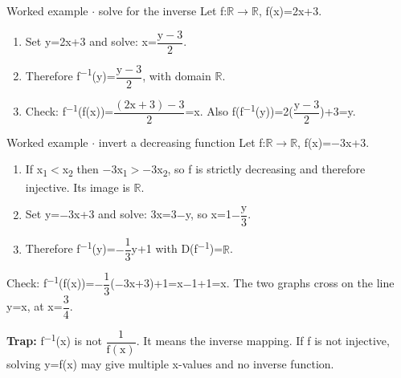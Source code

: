 \documentclass[11pt]{article}
\begin{document}
\begin{keepsection}
\begin{workedbox}{Worked example \ensuremath{\cdot} solve for the inverse}
Let f:\ensuremath{\mathbb{R}}\ensuremath{\to}\ensuremath{\mathbb{R}}, f(x)=2x+3.

\begin{enumerate}
\item Set y=2x+3 and solve: x={\small\ensuremath{\dfrac{\mathrm{y}-3}{2}}}.
\item Therefore f\textsuperscript{\ensuremath{-}1}(y)={\small\ensuremath{\dfrac{\mathrm{y}-3}{2}}}, with domain \ensuremath{\mathbb{R}}.
\item Check: f\textsuperscript{\ensuremath{-}1}(f(x))={\small\ensuremath{\dfrac{(2\mathrm{x}+3)-3}{2}}}=x. Also f(f\textsuperscript{\ensuremath{-}1}(y))=2({\small\ensuremath{\dfrac{\mathrm{y}-3}{2}}})+3=y.
\end{enumerate}
\end{workedbox}

\begin{workedbox}{Worked example \ensuremath{\cdot} invert a decreasing function}
Let f:\ensuremath{\mathbb{R}}\ensuremath{\to}\ensuremath{\mathbb{R}}, f(x)=\ensuremath{-}3x+3.

\begin{enumerate}
\item If x\textsubscript{1}\ensuremath{<}x\textsubscript{2} then \ensuremath{-}3x\textsubscript{1}\ensuremath{>}\ensuremath{-}3x\textsubscript{2}, so f is strictly decreasing and therefore injective. Its image is \ensuremath{\mathbb{R}}.
\item Set y=\ensuremath{-}3x+3 and solve: 3x=3\ensuremath{-}y, so x=1\ensuremath{-}{\small\ensuremath{\dfrac{\mathrm{y}}{3}}}.
\item Therefore f\textsuperscript{\ensuremath{-}1}(y)=\ensuremath{-}{\small\ensuremath{\dfrac{1}{3}}}y+1 with D(f\textsuperscript{\ensuremath{-}1})=\ensuremath{\mathbb{R}}.
\end{enumerate}

Check: f\textsuperscript{\ensuremath{-}1}(f(x))=\ensuremath{-}{\small\ensuremath{\dfrac{1}{3}}}(\ensuremath{-}3x+3)+1=x\ensuremath{-}1+1=x. The two graphs cross on the line y=x, at x={\small\ensuremath{\dfrac{3}{4}}}.
\end{workedbox}

\begin{notebox}\textbf{Trap:} f\textsuperscript{\ensuremath{-}1}(x) is not {\small\ensuremath{\dfrac{1}{\mathrm{f}(\mathrm{x})}}}. It means the inverse mapping. If f is not injective, solving y=f(x) may give multiple x-values and no inverse function.\end{notebox}


\end{keepsection}
\end{document}
